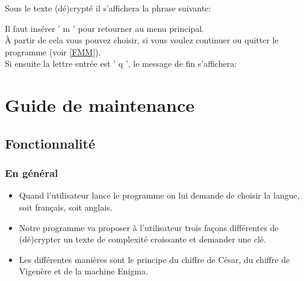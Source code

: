 \documentclass[a4paper,12pt,abstracton,titlepage]{scrartcl}
\begin{document}
Sous le texte (dé)crypté il s'affichera la phrase suivante:

\vspace{0.5cm}
{
\label{FrCon}
\vspace{0.7cm}

Il faut insérer ' m ' pour retourner au menu principal.\\

À partir de cela vous pouvez choisir, si vous voulez continuer ou quitter le programme (voir \ref{FMM}).\\

Si ensuite la lettre entrée est ' q ', le message de fin s'affichera:

\vspace{0.5cm}
{		%
\label{FSQM}
}



\newpage
\section{Guide de maintenance}
\subsection{Fonctionnalité}
\subsubsection{En général}
\begin{itemize}
\item Quand l’utilisateur lance le programme on lui demande de choisir la langue, soit français, soit anglais.
\item Notre programme va proposer à l’utilisateur trois façons différentes de (dé)crypter un texte de complexité croissante et demander une clé.
\item Les différentes manières sont le principe du chiffre de César, du chiffre de Vigenère et de la machine Enigma.
\end{itemize}

}
\end{document}
